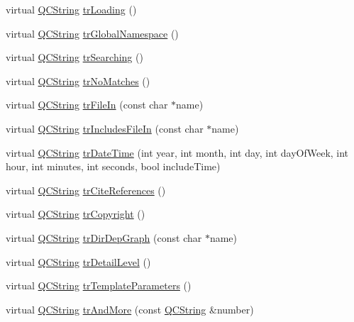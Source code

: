 \begin{DoxyCompactItemize}
virtual \hyperlink{class_q_c_string}{Q\-C\-String} \hyperlink{class_translator_slovak_aca8cf7409bceb9f8e6af47f637da5457}{tr\-Loading} ()
\item 
virtual \hyperlink{class_q_c_string}{Q\-C\-String} \hyperlink{class_translator_slovak_aa9fd39641e570165be20c71c67481fee}{tr\-Global\-Namespace} ()
\item 
virtual \hyperlink{class_q_c_string}{Q\-C\-String} \hyperlink{class_translator_slovak_aea79f5912e787bbb2c441223ccd382c6}{tr\-Searching} ()
\item 
virtual \hyperlink{class_q_c_string}{Q\-C\-String} \hyperlink{class_translator_slovak_a240e49b617153456e0f29bef561cc10f}{tr\-No\-Matches} ()
\item 
virtual \hyperlink{class_q_c_string}{Q\-C\-String} \hyperlink{class_translator_slovak_acf964d17bad4c55c393193fe9708575f}{tr\-File\-In} (const char $\ast$name)
\item 
virtual \hyperlink{class_q_c_string}{Q\-C\-String} \hyperlink{class_translator_slovak_a53f57c6e2aa0b9dc09bc47b3746d3481}{tr\-Includes\-File\-In} (const char $\ast$name)
\item 
virtual \hyperlink{class_q_c_string}{Q\-C\-String} \hyperlink{class_translator_slovak_a19c43671f677ae0445fca1fe7a5f62cc}{tr\-Date\-Time} (int year, int month, int day, int day\-Of\-Week, int hour, int minutes, int seconds, bool include\-Time)
\item 
virtual \hyperlink{class_q_c_string}{Q\-C\-String} \hyperlink{class_translator_slovak_ae43b2c6dbb1637144e32cd13a0d4704c}{tr\-Cite\-References} ()
\item 
virtual \hyperlink{class_q_c_string}{Q\-C\-String} \hyperlink{class_translator_slovak_a840474c30dfc2d4e92d1a29c5d1bf343}{tr\-Copyright} ()
\item 
virtual \hyperlink{class_q_c_string}{Q\-C\-String} \hyperlink{class_translator_slovak_abbe522be6eed72f54409458a1896323c}{tr\-Dir\-Dep\-Graph} (const char $\ast$name)
\item 
virtual \hyperlink{class_q_c_string}{Q\-C\-String} \hyperlink{class_translator_slovak_a138b581235bf64a0338ed25ee0d1ad61}{tr\-Detail\-Level} ()
\item 
virtual \hyperlink{class_q_c_string}{Q\-C\-String} \hyperlink{class_translator_slovak_ad9599164391093757c91bbe746f694a5}{tr\-Template\-Parameters} ()
\item 
virtual \hyperlink{class_q_c_string}{Q\-C\-String} \hyperlink{class_translator_slovak_a391327398836ee03f1d00415b80cb997}{tr\-And\-More} (const \hyperlink{class_q_c_string}{Q\-C\-String} \&number)

\end{DoxyCompactItemize}
